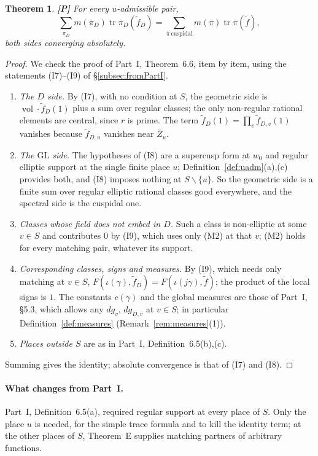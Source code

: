 \documentclass[12pt]{article}
\newcommand{\ov}[1]{\overline{#1}}
\newcommand{\tr}{\operatorname{tr}}
\newcommand{\vol}{\operatorname{vol}}
\newcommand{\GL}{\mathrm{GL}}
\newcommand{\Zb}{\ov{Z}}
\newcommand{\pib}{\ov{\pi}}
\newcommand{\Pv}{\textbf{[P]}}
\theoremstyle{plain}
\newtheorem{theorem}{Theorem}[section]
\theoremstyle{definition}
\begin{document}
\begin{theorem}\label{thm:comparison2}\Pv
For every $u$-admissible pair,
\[ \sum_{\pib_D}m(\pib_D)\tr\pib_D(\tilde f_D)=\sum_{\pib\ \mathrm{cuspidal}}m(\pib)\tr\pib(\tilde f), \]
both sides converging absolutely.
\end{theorem}
\begin{proof}
We check the proof of Part~I, Theorem~6.6, item by item, using the statements (I7)--(I9) of \S\ref{subsec:fromPartI}.
\begin{enumerate}[label=(\arabic*)]
\item \emph{The $D$ side.} By (I7), with no condition at $S$, the geometric side is $\vol\cdot\tilde f_D(1)$ plus a sum over regular classes; the only non-regular rational elements are central, since $r$ is prime. The term $\tilde f_D(1)=\prod_v\tilde f_{D,v}(1)$ vanishes because $\tilde f_{D,u}$ vanishes near $\Zb_u$.
\item \emph{The $\GL$ side.} The hypotheses of (I8) are a supercusp form at $w_0$ and regular elliptic support at the single finite place $u$; Definition~\ref{def:uadm}(a),(c) provides both, and (I8) imposes nothing at $S\smallsetminus\{u\}$. So the geometric side is a finite sum over regular elliptic rational classes good everywhere, and the spectral side is the cuspidal one.
\item \emph{Classes whose field does not embed in $D$.} Such a class is non-elliptic at some $v\in S$ and contributes $0$ by (I9), which uses only (M2) at that $v$; (M2) holds for every matching pair, whatever its support.
\item \emph{Corresponding classes, signs and measures.} By (I9), which needs only matching at $v\in S$, $F(\iota(\gamma),\tilde f_D)=F(\iota(j\gamma),\tilde f)$; the product of the local signs is $1$. The constants $c(\gamma)$ and the global measures are those of Part~I, \S5.3, which allows any $dg_v$, $dg_{D,v}$ at $v\in S$; in particular Definition~\ref{def:measures} (Remark~\ref{rem:measures}(1)).
\item \emph{Places outside $S$} are as in Part~I, Definition~6.5(b),(c).
\end{enumerate}
Summing gives the identity; absolute convergence is that of (I7) and (I8).
\end{proof}

\paragraph{What changes from Part~I.} Part~I, Definition~6.5(a), required regular support at every place of $S$. Only the place $u$ is needed, for the simple trace formula and to kill the identity term; at the other places of $S$, Theorem~E supplies matching partners of arbitrary functions.
\end{document}
